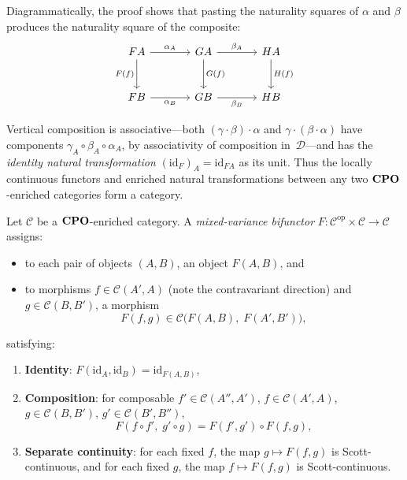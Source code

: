 Diagrammatically, the proof shows that pasting the naturality
squares of $\alpha$ and $\beta$ produces the naturality square of the
composite:
\[
\begin{tikzcd}[column sep=large, row sep=large]
FA \arrow[r, "\alpha_A"] \arrow[d, "F(f)"'] &
  GA \arrow[r, "\beta_A"] \arrow[d, "G(f)"] &
  HA \arrow[d, "H(f)"] \\
FB \arrow[r, "\alpha_B"'] &
  GB \arrow[r, "\beta_B"'] & HB
\end{tikzcd}
\]

Vertical composition is associative---both
$(\gamma \cdot \beta) \cdot \alpha$ and
$\gamma \cdot (\beta \cdot \alpha)$ have components
$\gamma_A \circ \beta_A \circ \alpha_A$, by associativity of
composition in~$\mathcal{D}$---and has the \emph{identity natural
transformation} $(\mathrm{id}_F)_A = \mathrm{id}_{FA}$ as its unit.
Thus the locally continuous functors and enriched natural transformations
between any two $\mathbf{CPO}$-enriched categories form a category.

\begin{definition}
\label{def:mixed-bifunctor}
Let $\mathcal{C}$ be a $\mathbf{CPO}$-enriched category. A \emph{mixed-variance
bifunctor} $F : \mathcal{C}^{\mathrm{op}} \times \mathcal{C} \to
\mathcal{C}$ assigns:
\begin{itemize}
  \item to each pair of objects $(A, B)$, an object $F(A, B)$, and
  \item to morphisms $f \in \mathcal{C}(A', A)$ (note the contravariant
        direction) and $g \in \mathcal{C}(B, B')$, a morphism
        \[
          F(f, g) \in \mathcal{C}\bigl(F(A, B),\; F(A', B')\bigr),
        \]
\end{itemize}
satisfying:
\begin{enumerate}
  \item \textbf{Identity}: $F(\mathrm{id}_A, \mathrm{id}_B) =
        \mathrm{id}_{F(A,B)}$,
  \item \textbf{Composition}: for composable
        $f' \in \mathcal{C}(A'', A')$, $f \in \mathcal{C}(A', A)$,
        $g \in \mathcal{C}(B, B')$, $g' \in \mathcal{C}(B', B'')$,
        \[
          F(f \circ f',\; g' \circ g)
            = F(f', g') \circ F(f, g),
        \]
  \item \textbf{Separate continuity}: for each fixed $f$, the map
        $g \mapsto F(f, g)$ is Scott-continuous, and for each fixed $g$,
        the map $f \mapsto F(f, g)$ is Scott-continuous.
\end{enumerate}
\end{definition}

